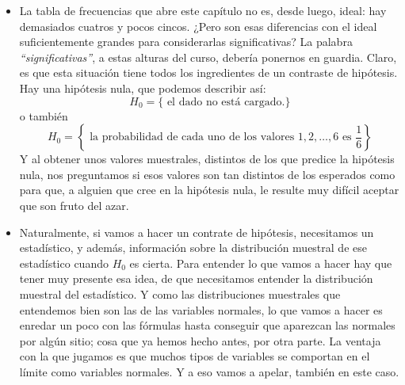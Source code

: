 \begin{itemize}
    \item La tabla de frecuencias que abre este capítulo no es, desde luego, ideal: hay demasiados cuatros y pocos cincos. ¿Pero son esas diferencias con el ideal suficientemente grandes para considerarlas {\sf significativas}?
        La palabra {\em ``significativas''}, a estas alturas del curso, debería ponernos en guardia. Claro, es que esta situación tiene todos los ingredientes de un contraste de hipótesis. Hay una hipótesis nula, que podemos describir así:
        \[H_0=\{\mbox{ el dado no está cargado.} \}\]
        o también
        \[H_0=\left\{\mbox{ la probabilidad de cada uno de los valores $1,2,\ldots,6$ es $\dfrac{1}{6}$} \right\}\]
        Y al obtener unos valores muestrales, distintos de los que predice la hipótesis nula, nos preguntamos si esos valores son tan distintos de los esperados como para que, a alguien que cree en la hipótesis nula, le resulte muy difícil aceptar que son fruto del azar.

    \item Naturalmente, si vamos a hacer un contrate de hipótesis, necesitamos un estadístico, y además, información sobre la distribución muestral de ese estadístico cuando $H_0$ es cierta.
        Para entender lo que vamos a hacer hay que tener muy presente esa idea, de que necesitamos entender la distribución muestral del estadístico. Y como las distribuciones muestrales que entendemos bien son las de las variables normales, lo que vamos a hacer es enredar un poco con las fórmulas hasta conseguir que aparezcan las normales por algún sitio; cosa que ya hemos hecho antes, por otra parte. La ventaja con la que jugamos es que muchos tipos de variables se comportan en el límite como variables normales. Y a eso vamos a apelar, también en este caso.


\end{itemize}
